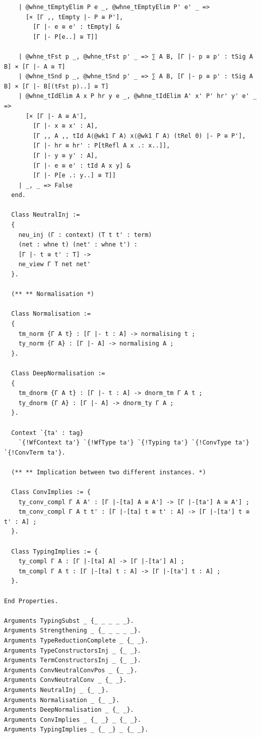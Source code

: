 \documentclass[10pt,a4paper]{amsart}
\begin{document}
\begin{lstlisting}
    | @whne_tEmptyElim P e _, @whne_tEmptyElim P' e' _ =>
      [× [Γ ,, tEmpty |- P ≅ P'],
        [Γ |- e ≅ e' : tEmpty] &
        [Γ |- P[e..] ≅ T]]
        
    | @whne_tFst p _, @whne_tFst p' _ => ∑ A B, [Γ |- p ≅ p' : tSig A B] × [Γ |- A ≅ T]
    | @whne_tSnd p _, @whne_tSnd p' _ => ∑ A B, [Γ |- p ≅ p' : tSig A B] × [Γ |- B[(tFst p)..] ≅ T]
    | @whne_tIdElim A x P hr y e _, @whne_tIdElim A' x' P' hr' y' e' _ =>
      [× [Γ |- A ≅ A'],
        [Γ |- x ≅ x' : A],
        [Γ ,, A ,, tId A⟨@wk1 Γ A⟩ x⟨@wk1 Γ A⟩ (tRel 0) |- P ≅ P'],
        [Γ |- hr ≅ hr' : P[tRefl A x .: x..]],
        [Γ |- y ≅ y' : A],
        [Γ |- e ≅ e' : tId A x y] &
        [Γ |- P[e .: y..] ≅ T]]
    | _, _ => False
  end.

  Class NeutralInj :=
  {
    neu_inj (Γ : context) (T t t' : term)
    (net : whne t) (net' : whne t') :
    [Γ |- t ≅ t' : T] ->
    ne_view Γ T net net'
  }.

  (** ** Normalisation *)

  Class Normalisation :=
  {
    tm_norm {Γ A t} : [Γ |- t : A] -> normalising t ;
    ty_norm {Γ A} : [Γ |- A] -> normalising A ;
  }.

  Class DeepNormalisation :=
  {
    tm_dnorm {Γ A t} : [Γ |- t : A] -> dnorm_tm Γ A t ;
    ty_dnorm {Γ A} : [Γ |- A] -> dnorm_ty Γ A ;
  }.

  Context `{ta' : tag}
    `{!WfContext ta'} `{!WfType ta'} `{!Typing ta'} `{!ConvType ta'} `{!ConvTerm ta'}.

  (** ** Implication between two different instances. *)

  Class ConvImplies := {
    ty_conv_compl Γ A A' : [Γ |-[ta] A ≅ A'] -> [Γ |-[ta'] A ≅ A'] ;
    tm_conv_compl Γ A t t' : [Γ |-[ta] t ≅ t' : A] -> [Γ |-[ta'] t ≅ t' : A] ;
  }.

  Class TypingImplies := {
    ty_compl Γ A : [Γ |-[ta] A] -> [Γ |-[ta'] A] ;
    tm_compl Γ A t : [Γ |-[ta] t : A] -> [Γ |-[ta'] t : A] ;
  }.

End Properties.

Arguments TypingSubst _ {_ _ _ _ _}.
Arguments Strengthening _ {_ _ _ _ _}.
Arguments TypeReductionComplete _ {_ _}.
Arguments TypeConstructorsInj _ {_ _}.
Arguments TermConstructorsInj _ {_ _}.
Arguments ConvNeutralConvPos _ {_ _}.
Arguments ConvNeutralConv _ {_ _}.
Arguments NeutralInj _ {_ _}.
Arguments Normalisation _ {_ _}.
Arguments DeepNormalisation _ {_ _}.
Arguments ConvImplies _ {_ _} _ {_ _}.
Arguments TypingImplies _ {_ _} _ {_ _}.
\end{lstlisting}
\end{document}
